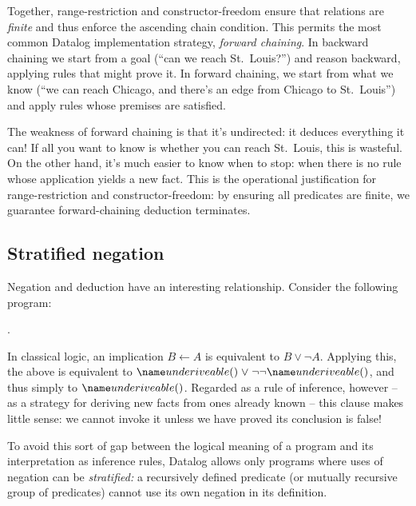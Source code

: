 \noindent
Together, range-restriction and constructor-freedom ensure that relations are
\emph{finite} and thus enforce the ascending chain condition.
%
This permits the most common Datalog implementation strategy, \emph{forward
  chaining}.
%
In backward chaining we start from a goal (``can we reach St.~Louis?'') and
reason backward, applying rules that might prove it.
%
In forward chaining, we start from what we know (``we can reach Chicago, and
there's an edge from Chicago to St.~Louis'') and apply rules whose premises are
satisfied.

The weakness of forward chaining is that it's undirected: it deduces everything
it can! If all you want to know is whether you can reach St.~Louis, this is
wasteful. On the other hand, it's much easier to know when to stop: when there
is no rule whose application yields a new fact. This is the operational
justification for range-restriction and constructor-freedom: by ensuring all
predicates are finite, we guarantee forward-chaining deduction terminates.%
%



\subsection{Stratified negation}
\label{section-stratified-negation}

Negation and deduction have an interesting relationship.
%
Consider the following program:

\begin{datalog}
   \gets \neg {}.
\end{datalog}

\noindent
In classical logic, an implication $B \gets A$ is equivalent to $B \vee \neg A$.
Applying this, the above is equivalent to $\atom{underiveable}{} \vee
\neg\neg\atom{underiveable}{}$, and thus simply to $\atom{underiveable}{}$.
%
Regarded as a rule of inference, however -- as a strategy for deriving new facts
from ones already known -- this clause makes little sense: we cannot invoke it
unless we have proved its conclusion is false!

To avoid this sort of gap between the logical meaning of a program and its
interpretation as inference rules, Datalog allows only programs where uses of
negation can be \emph{stratified:} a recursively defined predicate (or mutually
recursive group of predicates) cannot use its own negation in its definition.

